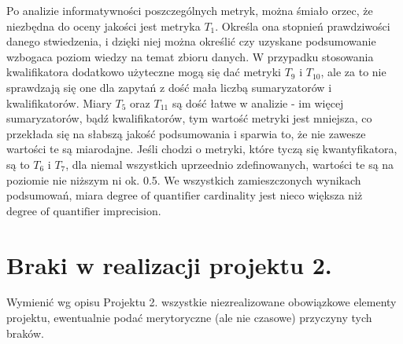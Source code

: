 \documentclass{classrep}
\begin{document}
Po analizie informatywności poszczególnych metryk, można śmiało orzec, że niezbędna do oceny jakości jest metryka \(T_1\). Określa ona stopnień prawdziwości danego stwiedzenia, i dzięki niej można określić czy uzyskane podsumowanie wzbogaca poziom wiedzy na temat zbioru danych. 
W przypadku stosowania kwalifikatora dodatkowo użyteczne mogą się dać metryki \(T_9\) i $T_{10}$, ale za to nie sprawdzają się one dla zapytań z dość mała liczbą sumaryzatorów i kwalifikatorów. Miary $T_5$ oraz $T_{11}$ są dość łatwe w analizie - im więcej sumaryzatorów, bądź kwalifikatorów, tym wartość metryki jest mniejsza, co przekłada się na słabszą jakość podsumowania i sparwia to, że nie zawesze
wartości te są miarodajne. Jeśli chodzi o metryki, które tyczą się kwantyfikatora, są to $T_6$ i $T_7$, dla niemal wszystkich uprzeednio zdefinowanych, wartości te są na poziomie nie niższym ni ok. 0.5. We wszystkich zamieszczonych wynikach podsumowań, miara \(\text{degree of quantifier cardinality}\) jest nieco większa niż 
\(\text{degree of quantifier imprecision}\). 






% 
% 
% 

\section{Braki w realizacji projektu 2.}
Wymienić wg opisu Projektu 2. wszystkie niezrealizowane obowiązkowe elementy projektu, ewentualnie
podać merytoryczne (ale nie czasowe) przyczyny tych braków. 
\end{document}
